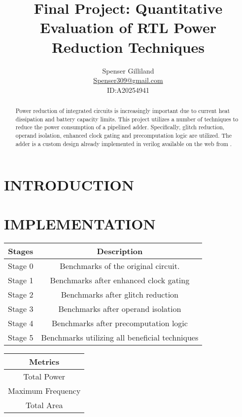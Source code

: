 \documentclass[10pt,letterpaper]{article}
\author{Spenser Gilliland\\
\url{Spenser309@gmail.com}\\
ID:A20254941}
\title{Final Project: Quantitative Evaluation of RTL Power Reduction Techniques}
\begin{document}
\maketitle
\bigskip

\begin{abstract}
Power reduction of integrated circuits is increasingly important due to current heat dissipation and battery capacity limits.  This project utilizes a number of techniques to reduce the power consumption of a pipelined adder.  Specifically, glitch reduction, operand isolation, enhanced clock gating and precomputation logic are utilized. The adder is a custom design already implemented in verilog available on the web from \cite{code}.
\end{abstract}

\pagebreak

\section{INTRODUCTION}

\section{IMPLEMENTATION}

\begin{center}
\begin{tabular}{|c|c|}
\hline Stages & Description \\
\hline 
\hline Stage 0 & Benchmarks of the original circuit. \\ 
\hline Stage 1 & Benchmarks after enhanced clock gating \\ 
\hline Stage 2 & Benchmarks after glitch reduction \\ 
\hline Stage 3 & Benchmarks after operand isolation \\ 
\hline Stage 4 & Benchmarks after precomputation logic \\ 
\hline Stage 5 & Benchmarks utilizing all beneficial techniques \\ 
\hline 
\end{tabular} 
\end{center}

\begin{center}
\begin{tabular}{|c|}
\hline Metrics \\
\hline 
\hline Total Power \\
\hline Maximum Frequency \\
\hline Total Area \\
\hline 
\end{tabular}
\end{center}
\end{document}
